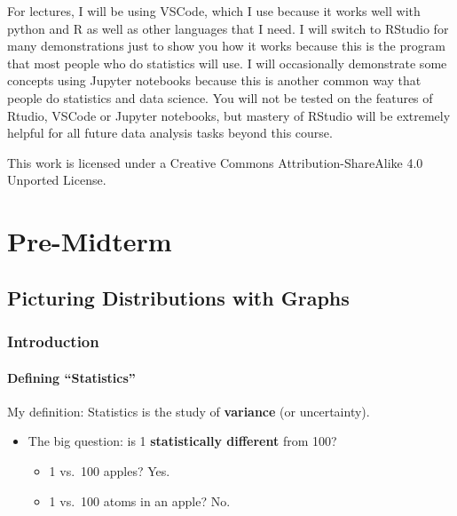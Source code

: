 \documentclass[
  letterpaper,
  DIV=11,
  numbers=noendperiod,
  oneside]{scrreprt}
\providecommand{\tightlist}{%
  \setlength{\itemsep}{0pt}\setlength{\parskip}{0pt}}\usepackage{longtable,booktabs,array}
\begin{document}
For lectures, I will be using VSCode, which I use because it works well
with python and R as well as other languages that I need. I will switch
to RStudio for many demonstrations just to show you how it works because
this is the program that most people who do statistics will use. I will
occasionally demonstrate some concepts using Jupyter notebooks because
this is another common way that people do statistics and data science.
You will not be tested on the features of Rtudio, VSCode or Jupyter
notebooks, but mastery of RStudio will be extremely helpful for all
future data analysis tasks beyond this course.

This work is licensed under a Creative Commons Attribution-ShareAlike
4.0 Unported License.

\part{Pre-Midterm}

\hypertarget{picturing-distributions-with-graphs}{%
\chapter{Picturing Distributions with
Graphs}\label{picturing-distributions-with-graphs}}

\hypertarget{introduction-1}{%
\section{Introduction}\label{introduction-1}}

\hypertarget{defining-statistics}{%
\subsection{Defining ``Statistics''}\label{defining-statistics}}

My definition: Statistics is the study of \textbf{variance} (or
uncertainty).

\begin{itemize}
\tightlist
\item
  The big question: is 1 \textbf{statistically different} from 100?

  \begin{itemize}
  \tightlist
  \item
    1 vs.~100 apples? Yes.
  \item
    1 vs.~100 atoms in an apple? No.
  \end{itemize}
\end{itemize}
\end{document}
